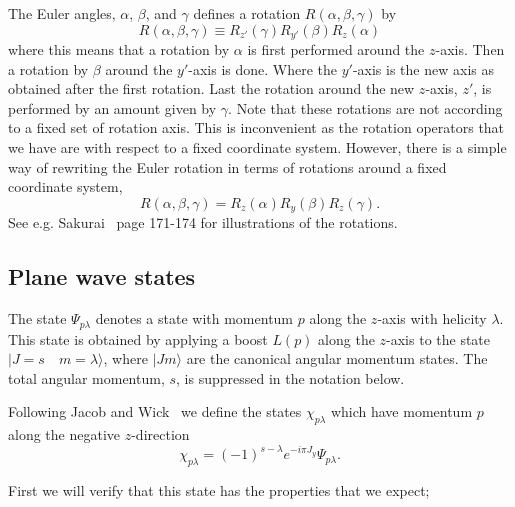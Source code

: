 The Euler angles, $\alpha$, $\beta$, and $\gamma$ defines a 
rotation $R(\alpha,\beta,\gamma)$ by
\begin{equation}
R(\alpha,\beta,\gamma)\equiv R_{z'}(\gamma)R_{y'}(\beta)R_{z}(\alpha)
\end{equation}
where this means that a rotation by $\alpha$ is first performed around the 
$z$-axis. Then a rotation by $\beta$ around the $y'$-axis is done. Where
the $y'$-axis is the new axis as obtained after the first rotation.
Last the rotation around the new $z$-axis, $z'$, is performed by an
amount given by $\gamma$. Note that these rotations are not according to
a fixed set of rotation axis. This is inconvenient as the rotation operators
that we have are with respect to a fixed coordinate system. However, 
there is a simple way of rewriting the Euler rotation in terms of
rotations around a fixed coordinate system,
\begin{equation}
R(\alpha,\beta,\gamma)=R_{z}(\alpha)R_{y}(\beta)R_{z}(\gamma).
\end{equation}
See e.g. Sakurai~\cite{Sakurai} page 171-174 for illustrations of the
rotations.


\subsection{Plane wave states}

The state $\Psi_{p\lambda}$ denotes a state with momentum $p$
along the $z$-axis with helicity $\lambda$. This state is obtained
by applying a boost $L(p)$ along the $z$-axis to the state 
$|J=s\quad m=\lambda\rangle$, where $|J m\rangle$ are the 
canonical angular momentum states. The total angular momentum,
$s$, is suppressed in the notation below.

Following Jacob and Wick~\cite{Jaco59} we define the states $\chi_{p\lambda}$
which have momentum $p$ along the negative $z$-direction
\begin{equation}
\chi_{p\lambda}=(-1)^{s-\lambda}e^{-i\pi J_y}\Psi_{p\lambda}.
\end{equation}

First we will verify that this state has the properties that
we expect; 

